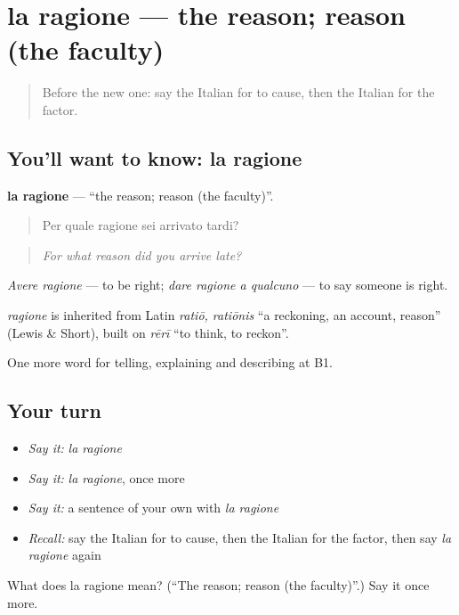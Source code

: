 \section[la ragione]{la ragione — the reason; reason (the faculty)}

\label{lesson:IT-C349-ragione}



\begin{quote}
Before the new one: say the Italian for to cause, then the Italian for the factor.
\end{quote}

\subsection*{You'll want to know: la ragione}
\textbf{la ragione} — \textquotedblleft{}the reason; reason (the faculty)\textquotedblright{}.

\begin{quote}
Per quale ragione sei arrivato tardi?
\end{quote}

\begin{quote}
\emph{For what reason did you arrive late?}
\end{quote}

\emph{Avere ragione} — to be right; \emph{dare ragione a qualcuno} — to say someone is right.

\begin{cousinweb}
\emph{ragione} is inherited from Latin \emph{ratiō, ratiōnis} \textquotedblleft{}a reckoning, an account, reason\textquotedblright{} (Lewis \& Short), built on \emph{rērī} \textquotedblleft{}to think, to reckon\textquotedblright{}.
\end{cousinweb}

\begin{grammarlens}[title={What you've built}]
One more word for telling, explaining and describing at B1.
\end{grammarlens}

\subsection*{Your turn}
\begin{itemize}
\raggedright
  \item \emph{Say it:} \emph{la ragione}
  \item \emph{Say it:} \emph{la ragione}, once more
  \item \emph{Say it:} a sentence of your own with \emph{la ragione}
  \item \emph{Recall:} say the Italian for to cause, then the Italian for the factor, then say \emph{la ragione} again
\end{itemize}

\begin{tcolorbox}[breakable,colback=teal!4,colframe=teal!35!black,title={Before you move on}]
What does la ragione mean? (\textquotedblleft{}The reason; reason (the faculty)\textquotedblright{}.) Say it once more.
\end{tcolorbox}
